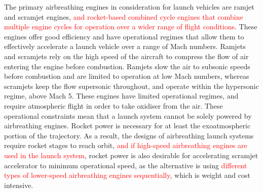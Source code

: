   	The primary airbreathing engines in consideration for launch vehicles are ramjet and scramjet engines, \textcolor{red}{and rocket-based combined cycle engines that combine multiple engine cycles for operation over a wider range of flight conditions}\cite{HeiserWilliamPratt1994,Kors1988}. These engines offer good efficiency and have operational regimes that allow them to effectively accelerate a launch vehicle over a range of Mach numbers. 
  	Ramjets and scramjets rely on the high speed of the aircraft to compress the flow of air entering the engine before combustion.  Ramjets slow the air to subsonic speeds before combustion and are limited to operation at low Mach numbers, whereas scramjets keep the flow supersonic throughout, and operate within the hypersonic regime, above Mach 5. 
  	These engines have limited operational regimes, and require atmospheric flight in order to take oxidiser from the air. These operational constraints mean that a launch system cannot be solely powered by airbreathing engines. Rocket power is necessary for at least the exoatmospheric portion of the trajectory. As a result, the designs of airbreathing launch systems require rocket stages to reach orbit\cite{Smart2009a}, \textcolor{red}{and if high-speed airbreathing engines are used in the launch system}, rocket power is also desirable for accelerating scramjet accelerator to minimum operational speed, as the alternative is using \textcolor{red}{different types of lower-speed airbreathing engines sequentially}\cite{Smart2009a}, which is weight and cost intensive. 
  	
